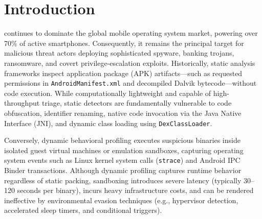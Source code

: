\documentclass[10pt,journal,compsoc]{IEEEtran}
\begin{document}
\maketitle
\IEEEdisplaynontitleabstractindextext
\IEEEpeerreviewmaketitle

\section{Introduction}
 continues to dominate the global mobile operating system market, powering over 70\% of active smartphones. Consequently, it remains the principal target for malicious threat actors deploying sophisticated spyware, banking trojans, ransomware, and covert privilege-escalation exploits. Historically, static analysis frameworks inspect application package (APK) artifacts—such as requested permissions in \texttt{AndroidManifest.xml} and decompiled Dalvik bytecode—without code execution. While computationally lightweight and capable of high-throughput triage, static detectors are fundamentally vulnerable to code obfuscation, identifier renaming, native code invocation via the Java Native Interface (JNI), and dynamic class loading using \texttt{DexClassLoader}.

Conversely, dynamic behavioral profiling executes suspicious binaries inside isolated guest virtual machines or emulation sandboxes, capturing operating system events such as Linux kernel system calls (\texttt{strace}) and Android IPC Binder transactions. Although dynamic profiling captures runtime behavior regardless of static packing, sandboxing introduces severe latency (typically 30--120 seconds per binary), incurs heavy infrastructure costs, and can be rendered ineffective by environmental evasion techniques (e.g., hypervisor detection, accelerated sleep timers, and conditional triggers).
\end{document}
